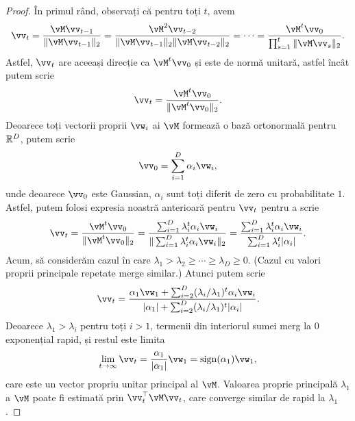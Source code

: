 \documentclass[../../book-main_ro.tex]{subfiles}
\begin{document}
\begin{proof} În primul rând, observați că pentru toți \(t\), avem 
\begin{equation}
    \vv_{t} = \frac{\vM\vv_{t - 1}}{\norm{\vM\vv_{t - 1}}_{2}} = \frac{\vM^{2}\vv_{t - 2}}{\norm{\vM\vv_{t - 1}}_{2}\norm{\vM\vv_{t - 2}}_{2}} = \cdots = \frac{\vM^{t}\vv_{0}}{\prod_{s = 1}^{t}\norm{\vM\vv_{s}}_{2}}.
\end{equation}
Astfel, \(\vv_{t}\) are aceeași direcție ca \(\vM^{t}\vv_{0}\) și este de normă unitară, astfel încât putem scrie 
\begin{equation}
    \vv_{t} = \frac{\vM^{t}\vv_{0}}{\norm{\vM^{t}\vv_{0}}_{2}}.
\end{equation}
Deoarece toți vectorii proprii \(\vw_{i}\) ai $\vM$ formează o bază ortonormală pentru \(\mathbb{R}^{D}\), putem scrie 
\begin{equation}
    \vv_{0} = \sum_{i = 1}^{D}\alpha_{i}\vw_{i},
\end{equation}
unde deoarece \(\vv_{0}\) este Gaussian, \(\alpha_{i}\) sunt toți diferit de zero cu probabilitate \(1\). Astfel, putem folosi expresia noastră anterioară pentru \(\vv_{t}\) pentru a scrie
\begin{equation}
    \vv_{t} = \frac{\vM^{t}\vv_{0}}{\norm{\vM^{t}\vv_{0}}_{2}} = \frac{\sum_{i = 1}^{D}\lambda_{i}^{t}\alpha_{i}\vw_{i}}{\norm{\sum_{i = 1}^{D}\lambda_{i}^{t}\alpha_{i}\vw_{i}}_{2}} = \frac{\sum_{i = 1}^{D}\lambda_{i}^{t}\alpha_{i}\vw_{i}}{\sum_{i = 1}^{D}\lambda_{i}^{t}\abs{\alpha_{i}}}. 
\end{equation}
Acum, să considerăm cazul în care \(\lambda_{1} > \lambda_{2} \geq \cdots \geq \lambda_{D} \geq 0\). (Cazul cu valori proprii principale repetate merge similar.) Atunci putem scrie
\begin{equation}
    \vv_{t} = \frac{\alpha_{1}\vw_{1} + \sum_{i = 2}^{D}(\lambda_{i}/\lambda_{1})^{t}\alpha_{i}\vw_{i}}{\abs{\alpha_{1}} + \sum_{i = 2}^{D}(\lambda_{i}/\lambda_{1})^{t}\abs{\alpha_{i}}}.
\end{equation}
Deoarece \(\lambda_{1} > \lambda_{i}\) pentru toți \(i > 1\), termenii din interiorul sumei merg la \(0\) exponențial rapid, și restul este limita 
\begin{equation}
    \lim_{t \to \infty}\vv_{t} = \frac{\alpha_{1}}{\abs{\alpha_{1}}}\vw_{1} = \sign(\alpha_{1})\vw_{1},
\end{equation}
care este un vector propriu unitar principal al \(\vM\). Valoarea proprie principală \(\lambda_{1}\) a \(\vM\) poate fi estimată prin \(\vv_{t}^{\top}\vM\vv_{t}\), care converge similar de rapid la \(\lambda_{1}\). 
\end{proof}
\end{document}
